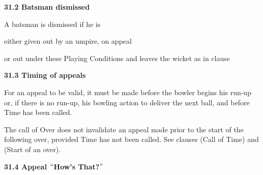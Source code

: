 \documentclass[12pt]{article}
\begin{document}
\vspace{\baselineskip}
{\fontsize{11pt}{13.2pt}\selectfont \textbf{31.2 \tabto{0.47in} Batsman dismissed}\par}\par


\vspace{\baselineskip}
{\fontsize{9pt}{10.8pt}\selectfont A batsman is dismissed if he is\par}\par


\vspace{\baselineskip}
{\fontsize{9pt}{10.8pt}\selectfont either given out by an umpire, on appeal\par}\par


\vspace{\baselineskip}
{\fontsize{9pt}{10.8pt}\selectfont or out under these Playing Conditions and leaves the wicket as in clause \par}\par


\vspace{\baselineskip}
{\fontsize{11pt}{13.2pt}\selectfont \textbf{31.3 \tabto{0.47in} Timing of appeals}\par}\par


\vspace{\baselineskip}
\begin{adjustwidth}{0.0in}{0.19in}
{\fontsize{9pt}{10.8pt}\selectfont For an appeal to be valid, it must be made before the bowler begins his run-up or, if there is no run-up, his bowling action to deliver the next ball, and before Time has been called.\par}\par

\end{adjustwidth}


\vspace{\baselineskip}
\begin{adjustwidth}{0.0in}{0.25in}
{\fontsize{9pt}{10.8pt}\selectfont The call of Over does not invalidate an appeal made prior to the start of the following over, provided Time has not been called. See clauses (Call of Time) and (Start of an over).\par}\par

\end{adjustwidth}


\vspace{\baselineskip}
{\fontsize{11pt}{13.2pt}\selectfont \textbf{31.4 \tabto{0.47in} Appeal $``$How’s That?$"$ }\par}\par
\end{document}
